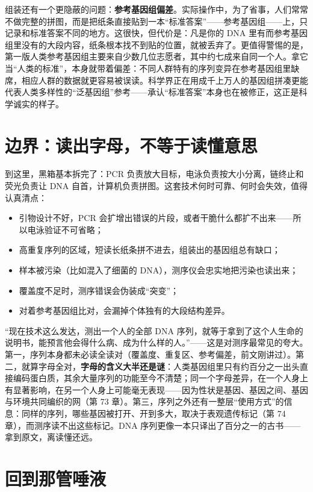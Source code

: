 组装还有一个更隐蔽的问题：\textbf{参考基因组偏差}。实际操作中，为了省事，人们常常不做完整的拼图，而是把纸条直接贴到一本“标准答案”——参考基因组——上，只记录和标准答案不同的地方。这很快，但代价是：凡是你的 DNA 里有而参考基因组里没有的大段内容，纸条根本找不到贴的位置，就被丢弃了。更值得警惕的是，第一版人类参考基因组主要来自少数几位志愿者，其中约七成来自同一个人。拿它当“人类的标准”，本身就带着偏差：不同人群特有的序列变异在参考基因组里缺席，相应人群的数据就更容易被误读。科学界正在用成千上万人的基因组拼凑更能代表人类多样性的“泛基因组”参考——承认“标准答案”本身也在被修正，这正是科学诚实的样子。

\section{边界：读出字母，不等于读懂意思}

到这里，黑箱基本拆完了：PCR 负责放大目标，电泳负责按大小分离，链终止和荧光负责让 DNA 自首，计算机负责拼图。这套技术何时可靠、何时会失效，值得认真清点：

\begin{itemize}[itemsep=2pt]
\item 引物设计不好，PCR 会扩增出错误的片段，或者干脆什么都扩不出来——所以电泳验证不可省略；
\item 高重复序列的区域，短读长纸条拼不进去，组装出的基因组总有缺口；
\item 样本被污染（比如混入了细菌的 DNA），测序仪会忠实地把污染也读出来；
\item 覆盖度不足时，测序错误会伪装成“突变”；
\item 对着参考基因组比对，会漏掉个体独有的大段结构差异。
\end{itemize}

\begin{wuqu}
“现在技术这么发达，测出一个人的全部 DNA 序列，就等于拿到了这个人生命的说明书，能预言他会得什么病、成为什么样的人。”——这是对测序最常见的夸大。第一，序列本身都未必读全读对（覆盖度、重复区、参考偏差，前文刚讲过）。第二，就算字母全对，\textbf{字母的含义大半还是谜}：人类基因组里只有约百分之一出头直接编码蛋白质，其余大量序列的功能至今不清楚；同一个字母差异，在一个人身上有显著影响，在另一个人身上可能毫无表现——因为性状是基因、基因之间、基因与环境共同编织的网（第 73 章）。第三，序列之外还有一整层“使用方式”的信息：同样的序列，哪些基因被打开、开到多大，取决于表观遗传标记（第 74 章），而测序读不出这些标记。DNA 序列更像一本只译出了百分之一的古书——拿到原文，离读懂还远。
\end{wuqu}

\section{回到那管唾液}

